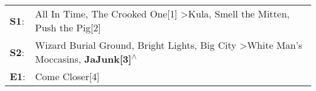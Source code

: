 \begin{supertabular}{p{0.03\textwidth}p{0.92\textwidth}}
 \textbf{S1}:  &  All In Time\textsuperscript{}, \enspace The Crooked One[1]\textsuperscript{} \textgreater \enspace Kula\textsuperscript{}, \enspace Smell the Mitten\textsuperscript{}, \enspace Push the Pig[2]\textsuperscript{}  \enspace  \\
 \textbf{S2}:  &     Wizard Burial Ground\textsuperscript{}, \enspace Bright Lights, Big City\textsuperscript{} \textgreater \enspace White Man's Moccasins\textsuperscript{}, \enspace \textbf{JaJunk[3]\textsuperscript{$\wedge$}}  \enspace  \\
 \textbf{E1}:  &                                                                                                                                                                                    Come Closer[4]\textsuperscript{}  \enspace  \\
\end{supertabular}
